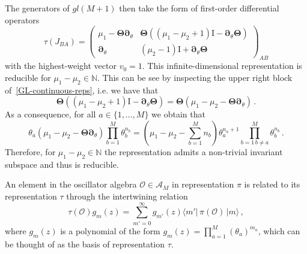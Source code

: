 \documentclass[11pt]{article}
\numberwithin{equation}{section}
\newcommand{\mmu}{\mu}
\newcommand{\M}{M}
\newcommand{\OZ}{\bm{\partial}_{\theta}}
\newcommand{\OZD}{\bm{\Theta}}
\newcommand{\ID}{\mathrm{I}}
\newcommand{\hidden}{\theta}
\newcommand{\Hidden}{\Theta}
\newcommand{\rep}{\tau}
\begin{document}
 The generators of $gl(M+1)$ then take the form of first-order differential operators
 \begin{equation}\label{GL-continuous-reps}
		\rep(J_{BA})=\left(\begin{array}{cc}
			\mmu_1-\OZD\OZ&\OZD\left((\mmu_1-\mmu_2+1)\ID-\OZ\OZD\right)\\
			\OZ&(\mmu_2-1)\ID+\OZ\OZD
		\end{array}\right) _{AB}
	\end{equation}
    with the  highest-weight vector $v_0 = 1$.  This infinite-dimensional representation is reducible for $\mu_1-\mu_2\in\mathbb{N}$. This can be see by inspecting the upper right block of~\eqref{GL-continuous-reps}, i.e. we have that
    \begin{equation}
        \bm{\Hidden}\left((\mu_{1}-\mu_{2}+1)\ID-\bm{\partial}_{\hidden}\bm{\Hidden}\right)=\bm{\Hidden}(\mu_{1}-\mu_{2}-\bm{\Hidden}\bm{\partial}_{\hidden})\,.
    \end{equation}
    As a consequence, for all $a\in \{1,\ldots, \M\}$ we obtain that
    \begin{equation}
        \hidden_{a}(\mu_{1}-\mu_{2}-\bm{\Hidden}\bm{\partial}_{\hidden})\prod_{b=1}^{\M}\hidden_{b}^{n_{b}}=\left(\mu_{1}-\mu_{2}-\sum_{b=1}^{\M}n_{b}\right)\hidden_{a}^{n_{a}+1}\prod_{b=1\,b\neq a}^{\M}\hidden_{b}^{n_{b}}\,.
    \end{equation}
    Therefore, for $\mu_{1}-\mu_{2}\in \mathbb{N}$ the representation admits a non-trivial invariant subspace and thus is reducible.

    An element  in the oscillator algebra $\mathcal{O}\in\mathcal{A}_M$ in  representation $\pi$ is related to its representation $\rep$ through the intertwining relation
     \begin{equation}\label{intertw}
 \rep(\mathcal{O} )g_{m}(z)=\sum_{m'=0}^\infty g_{m'}(z)\langle m'| \,\pi(\mathcal{O} ) \,|m\rangle  \,,
 \end{equation}
 where $g_{m}(z)$ is a polynomial of the form $g_{m}(z)=\prod_{a=1}^{\M}(\hidden_a)^{m_a}$, which can be thought of as the basis of representation $\rep $. 
    
\end{document}
